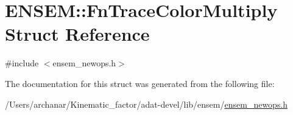 \hypertarget{structENSEM_1_1FnTraceColorMultiply}{}\section{E\+N\+S\+EM\+:\+:Fn\+Trace\+Color\+Multiply Struct Reference}
\label{structENSEM_1_1FnTraceColorMultiply}


{\ttfamily \#include $<$ensem\+\_\+newops.\+h$>$}



The documentation for this struct was generated from the following file\+:\begin{DoxyCompactItemize}
\item 
/\+Users/archanar/\+Kinematic\+\_\+factor/adat-\/devel/lib/ensem/\mbox{\hyperlink{adat-devel_2lib_2ensem_2ensem__newops_8h}{ensem\+\_\+newops.\+h}}\end{DoxyCompactItemize}
